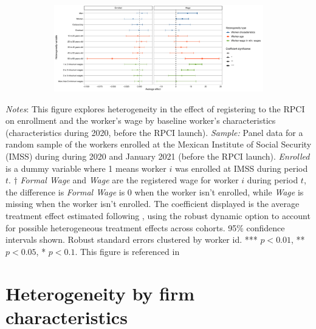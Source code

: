 \begin{figure}[H]
    \centering
    \caption{Heterogeneity by worker characteristics \label{fig:heterogeneity_worker_rpci}}
    
    \begin{subfigure}{\textwidth}
    \includegraphics[width=\textwidth]{04_Figures/muestra_10porciento/dcdh_heterogeneity_worker_characteristics_paper.pdf}
    \end{subfigure}
    
\end{figure}

\scriptsize{
\noindent \textit{Notes}: This figure explores heterogeneity in the effect of registering to the RPCI on enrollment and the worker's wage by baseline worker's characteristics (characteristics during 2020, before the RPCI launch). \textit{Sample:} Panel data for a random sample of the workers enrolled at the Mexican Institute of Social Security (IMSS) during during 2020 and January 2021 (before the RPCI launch). \textit{Enrolled} is a dummy variable where 1 means worker $i$ was enrolled at IMSS during period $t$. $\dagger$ \textit{Formal Wage} and \textit{Wage} are the registered wage for worker $i$ during period $t$, the difference is \textit{Formal Wage} is 0 when the worker isn't enrolled, while \textit{Wage} is missing when the worker isn't enrolled. The coefficient displayed is the average treatment effect estimated following \cite{de2020two}, using the robust dynamic option to account for possible heterogeneous treatment effects across cohorts. 95\% confidence intervals shown. Robust standard errors clustered by worker id. *** $p<0.01$, ** $p<0.05$, * $p<0.1$. This figure is referenced in %
}

\clearpage

\section{Heterogeneity by firm characteristics}

